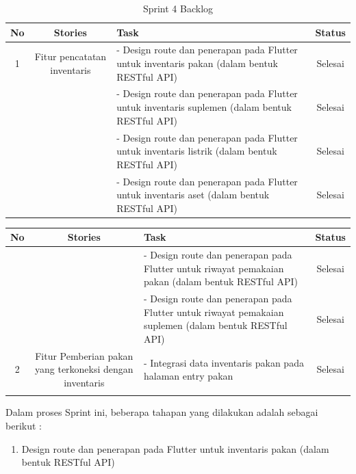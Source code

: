 \begin{spacing}{1.5}
	\begin{table}[H]	
		\begin{center}
			\caption{Sprint 4 Backlog}
			\label{tab:table21}
			\begin{tabular}{|c|c|m{13em}|c|}
			\hline
			\textbf{No} & \textbf{Stories} & \textbf{Task} & \textbf{Status} \\
			\hline
			1 & \multirow{1}{12em}{Fitur pencatatan inventaris} & - Design route dan penerapan pada Flutter untuk inventaris pakan (dalam bentuk RESTful API) & Selesai \\
			\hline
			&  & - Design route dan penerapan pada Flutter untuk inventaris suplemen (dalam bentuk RESTful API) & Selesai  \\ 
			\hline
			&  & - Design route dan penerapan pada Flutter untuk inventaris listrik (dalam bentuk RESTful API) & Selesai  \\ 
			\hline
			&  & - Design route dan penerapan pada Flutter untuk inventaris aset (dalam bentuk RESTful API) & Selesai  \\ 
			\hline
			\end{tabular}
		\end{center}
	\end{table}


	\begin{table}[H]	
		\begin{center}
			\begin{tabular}{|c|c|m{13em}|c|}
			\hline
			\textbf{No} & \textbf{Stories} & \textbf{Task} & \textbf{Status} \\
			\hline
			&  & - Design route dan penerapan pada Flutter untuk riwayat pemakaian pakan (dalam bentuk RESTful API) & Selesai  \\ 
			\hline
			&  & - Design route dan penerapan pada Flutter untuk riwayat pemakaian suplemen (dalam bentuk RESTful API) & Selesai  \\ 
			\hline
			2 & \multirow{1}{12em}{Fitur Pemberian pakan yang terkoneksi dengan inventaris} & - Integrasi data inventaris pakan pada halaman entry pakan  & Selesai \\
			&  &  &  \\ 
			\hline
			\end{tabular}
		\end{center}
	\end{table}

	Dalam proses Sprint ini, beberapa tahapan yang dilakukan adalah sebagai berikut :

	\begin{enumerate}
		\item Design route dan penerapan pada Flutter untuk inventaris pakan (dalam bentuk RESTful API)
		

\end{enumerate}
\end{spacing}
